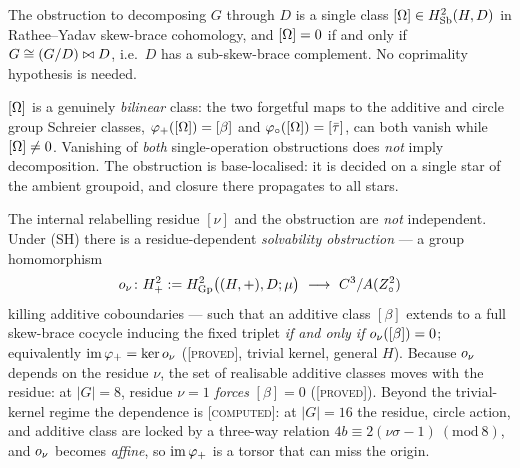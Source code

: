 \begin{theorem}
\label{thm:A-informal}
The obstruction to decomposing $G$ through $D$ is a single class
$[\Omega]\in H^2_{\mathrm{Sb}}(H,D)$ in Rathee--Yadav skew-brace cohomology, and
$[\Omega]=0$ if and only if $G\cong(G/D)\bowtie D$, i.e.\ $D$ has a sub-skew-brace
complement. No coprimality hypothesis is needed.
\end{theorem}

\begin{theorem}
\label{thm:B-informal}
$[\Omega]$ is a genuinely \emph{bilinear} class: the two forgetful maps to the
additive and circle group Schreier classes,
$\varphi_+([\Omega])=[\beta]$ and $\varphi_\circ([\Omega])=[\bar\tau]$, can both vanish while
$[\Omega]\neq0$. Vanishing of \emph{both} single-operation obstructions does
\emph{not} imply decomposition. The obstruction is base-localised: it is decided
on a single star of the ambient groupoid, and closure there propagates to all
stars.
\end{theorem}

\begin{theorem}
\label{thm:C-informal}
The internal relabelling residue $[\nu]$ and the obstruction are \emph{not}
independent. Under (SH) there is a residue-dependent \emph{solvability obstruction}
--- a group homomorphism
\[
   \onu\colon\Hcoh_+ := \Hcoh_{\Gp}\big((H,+),D;\mu\big)\ \longrightarrow\ C^3/A(Z^2_\circ)
\]
killing additive coboundaries --- such that an additive class $[\beta]$ extends to
a full skew-brace cocycle inducing the fixed triplet \emph{if and only if}
$o_\nu([\beta])=0$; equivalently $\operatorname{im}\varphi_+=\operatorname{ker}o_\nu$ \textup{(\textsc{[proved]},
trivial kernel, general $H$)}. Because $o_\nu$ depends on the residue $\nu$, the set
of realisable additive classes moves with the residue: at $|G|=8$, residue $\nu=1$
\emph{forces} $[\beta]=0$ \textup{(\textsc{[proved]})}. Beyond the trivial-kernel
regime the dependence is \textsc{[computed]}: at $|G|=16$ the residue, circle action,
and additive class are locked by a three-way relation
$4b\equiv2(\nu\sigma-1)\ (\mathrm{mod}\ 8)$, and $o_\nu$ becomes \emph{affine}, so
$\operatorname{im}\varphi_+$ is a torsor that can miss the origin.
\end{theorem}

